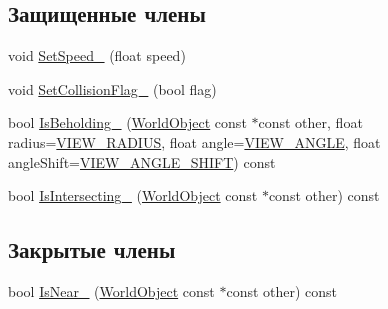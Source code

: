 \subsection*{Защищенные члены}
\begin{DoxyCompactItemize}
\item 
void \hyperlink{classrtm_1_1_dynamic_object_aceb38c6ff9d41d814953d4538e32542f}{Set\+Speed\+\_\+} (float speed)
\item 
void \hyperlink{classrtm_1_1_dynamic_object_a50d64daac674d1e9f55ce1fb73cf9d6a}{Set\+Collision\+Flag\+\_\+} (bool flag)
\item 
bool \hyperlink{classrtm_1_1_dynamic_object_a8ed34444a34b29ff9a672839c6593558}{Is\+Beholding\+\_\+} (\hyperlink{classrtm_1_1_world_object}{World\+Object} const $\ast$const other, float radius=\hyperlink{namespacertm_a6ae2631935a995c34abce1c62fa3dcd7}{V\+I\+E\+W\+\_\+\+R\+A\+D\+I\+US}, float angle=\hyperlink{namespacertm_af0ecac808d3938e77a20990f1947c8fd}{V\+I\+E\+W\+\_\+\+A\+N\+G\+LE}, float angle\+Shift=\hyperlink{namespacertm_a10eed490bb183c7853ac317d82e0b1cd}{V\+I\+E\+W\+\_\+\+A\+N\+G\+L\+E\+\_\+\+S\+H\+I\+FT}) const
\item 
bool \hyperlink{classrtm_1_1_dynamic_object_a96af6b5ed31d2332a3a45acfbdf084e5}{Is\+Intersecting\+\_\+} (\hyperlink{classrtm_1_1_world_object}{World\+Object} const $\ast$const other) const
\end{DoxyCompactItemize}
\subsection*{Закрытые члены}
\begin{DoxyCompactItemize}
\item 
bool \hyperlink{classrtm_1_1_dynamic_object_a3df4074c83b3ab30d3080b4e99e08a5b}{Is\+Near\+\_\+} (\hyperlink{classrtm_1_1_world_object}{World\+Object} const $\ast$const other) const
\end{DoxyCompactItemize}
